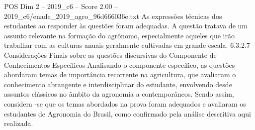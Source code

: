 \begin{textsample}{POS Dim 2 – 2019\_c6 – Score 2.00 – 2019\_c6/enade\_2019\_agro\_96d666036e.txt}
As expressões técnicas dos estudantes ao responder às questões foram adequadas.
A questão tratava de um assunto relevante na formação do agrônomo, especialmente aqueles que irão trabalhar com as culturas anuais geralmente cultivadas em grande escala. 6.3.2.7 Considerações Finais sobre as questões discursivas do Componente de Conhecimentos Específicos Analisando o componente específico, as questões abordaram temas de importância recorrente na agricultura, que avaliaram o conhecimento abrangente e interdisciplinar do estudante, envolvendo desde assuntos clássicos no âmbito da agronomia a contemporâneos.
Sendo assim, considera -se que os temas abordados na prova foram adequados e avaliaram os estudantes de Agronomia do Brasil, como confirmado pela análise descritiva aqui realizada.

\end{textsample}

